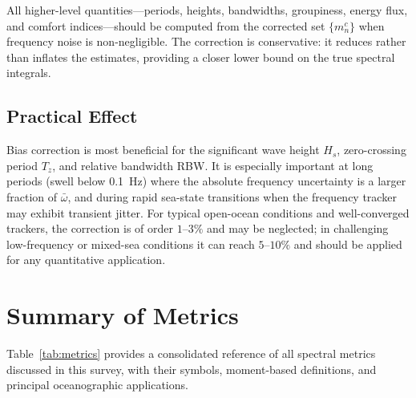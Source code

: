 \documentclass[journal]{IEEEtran}
\begin{document}
    All higher-level quantities---periods, heights, bandwidths, groupiness,
    energy flux, and comfort indices---should be computed from the
    corrected set $\{m_n^c\}$ when frequency noise is non-negligible.
    The correction is conservative: it reduces rather than inflates the
    estimates, providing a closer lower bound on the true spectral integrals.

    \subsection{Practical Effect}

    Bias correction is most beneficial for the significant wave height $H_s$,
    zero-crossing period $T_z$, and relative bandwidth RBW.
    It is especially important at long periods (swell below \SI{0.1}{\hertz})
    where the absolute frequency uncertainty is a larger fraction of
    $\bar\omega$, and during rapid sea-state transitions when the
    frequency tracker may exhibit transient jitter.
    For typical open-ocean conditions and well-converged trackers, the
    correction is of order $1$--$3\%$ and may be neglected; in challenging
    low-frequency or mixed-sea conditions it can reach $5$--$10\%$ and
    should be applied for any quantitative application.

    \section{Summary of Metrics}
    \label{sec:summary}

    Table~\ref{tab:metrics} provides a consolidated reference of all
    spectral metrics discussed in this survey, with their symbols,
    moment-based definitions, and principal oceanographic applications.
\end{document}
